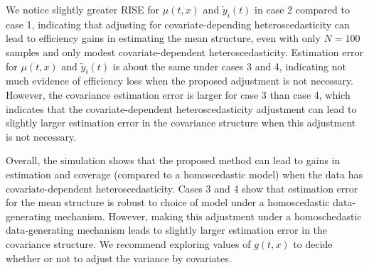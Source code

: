 \documentclass[useAMS,referee,usenatbib]{biom}
\begin{document}
We notice slightly greater RISE for $\mu(t, x)$ and $\tilde{y}_{i}(t)$ in case 2 compared to case 1, indicating that adjusting for covariate-depending heteroscedasticity can lead to efficiency gains in estimating the mean structure, even with only $N=100$ samples and only modest covariate-dependent heteroscedasticity. Estimation error for $\mu(t, x)$ and $\tilde{y}_{i}(t)$ is about the same under cases 3 and 4, indicating not much evidence of efficiency loss when the proposed adjustment is not necessary. However, the covariance estimation error is larger for case 3 than case 4, which indicates that the covariate-dependent heteroscedasticity adjustment can lead to slightly larger estimation error in the covariance structure when this adjustment is not necessary. 

Overall, the simulation shows that the proposed method can lead to gains in estimation and coverage (compared to a homoscedastic model) when the data has covariate-dependent heteroscedasticity. Cases 3 and 4 show that estimation error for the mean structure is robust to choice of model under a homoscedastic data-generating mechanism. However, making this adjustment under a homoschedastic data-generating mechanism leads to slightly larger estimation error in the covariance structure. We recommend exploring values of $g(t, x)$ to decide whether or not to adjust the variance by covariates. 
\end{document}
